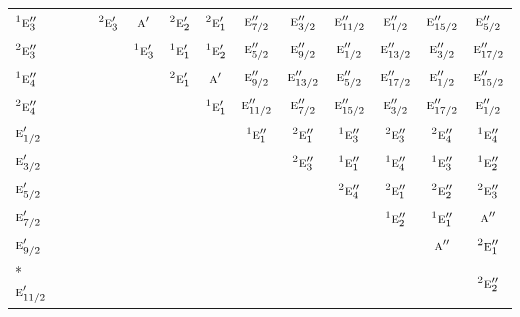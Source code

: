 \documentclass[10pt,a4paper]{article}
\numberwithin{equation}{section}
\newcommand{\irr}[1]{\text{\normalfont\scshape #1}}
\newcommand{\conjpair}[1]{{}^{#1}}
\begin{document}
{\begin{longtable}{@{}lcccccccccccc@{}}
$\conjpair{1}\irr{e}_{3}''$ &  &  & $\conjpair{2}\irr{e}_{3}'$ & $\irr{a}'$ & $\conjpair{2}\irr{e}_{2}'$ & $\conjpair{2}\irr{e}_{1}'$ & $\irr{e}_{7/2}''$ & $\irr{e}_{3/2}''$ & $\irr{e}_{11/2}''$ & $\irr{e}_{1/2}''$ & $\irr{e}_{15/2}''$ & $\irr{e}_{5/2}''$\\
$\conjpair{2}\irr{e}_{3}''$ &  &  &  & $\conjpair{1}\irr{e}_{3}'$ & $\conjpair{1}\irr{e}_{1}'$ & $\conjpair{1}\irr{e}_{2}'$ & $\irr{e}_{5/2}''$ & $\irr{e}_{9/2}''$ & $\irr{e}_{1/2}''$ & $\irr{e}_{13/2}''$ & $\irr{e}_{3/2}''$ & $\irr{e}_{17/2}''$\\
$\conjpair{1}\irr{e}_{4}''$ &  &  &  &  & $\conjpair{2}\irr{e}_{1}'$ & $\irr{a}'$ & $\irr{e}_{9/2}''$ & $\irr{e}_{13/2}''$ & $\irr{e}_{5/2}''$ & $\irr{e}_{17/2}''$ & $\irr{e}_{1/2}''$ & $\irr{e}_{15/2}''$\\
$\conjpair{2}\irr{e}_{4}''$ &  &  &  &  &  & $\conjpair{1}\irr{e}_{1}'$ & $\irr{e}_{11/2}''$ & $\irr{e}_{7/2}''$ & $\irr{e}_{15/2}''$ & $\irr{e}_{3/2}''$ & $\irr{e}_{17/2}''$ & $\irr{e}_{1/2}''$\\
$\irr{e}_{1/2}'$ &  &  &  &  &  &  & $\conjpair{1}\irr{e}_{1}''$ & $\conjpair{2}\irr{e}_{1}''$ & $\conjpair{1}\irr{e}_{3}''$ & $\conjpair{2}\irr{e}_{3}''$ & $\conjpair{2}\irr{e}_{4}''$ & $\conjpair{1}\irr{e}_{4}''$\\
$\irr{e}_{3/2}'$ &  &  &  &  &  &  &  & $\conjpair{2}\irr{e}_{3}''$ & $\conjpair{1}\irr{e}_{1}''$ & $\conjpair{1}\irr{e}_{4}''$ & $\conjpair{1}\irr{e}_{3}''$ & $\conjpair{1}\irr{e}_{2}''$\\
$\irr{e}_{5/2}'$ &  &  &  &  &  &  &  &  & $\conjpair{2}\irr{e}_{4}''$ & $\conjpair{2}\irr{e}_{1}''$ & $\conjpair{2}\irr{e}_{2}''$ & $\conjpair{2}\irr{e}_{3}''$\\
$\irr{e}_{7/2}'$ &  &  &  &  &  &  &  &  &  & $\conjpair{1}\irr{e}_{2}''$ & $\conjpair{1}\irr{e}_{1}''$ & $\irr{a}''$\\
$\irr{e}_{9/2}'$ &  &  &  &  &  &  &  &  &  &  & $\irr{a}''$ & $\conjpair{2}\irr{e}_{1}''$\\*
$\irr{e}_{11/2}'$ &  &  &  &  &  &  &  &  &  &  &  & $\conjpair{2}\irr{e}_{2}''$\\
\bottomrule\end{longtable}}
\end{document}

